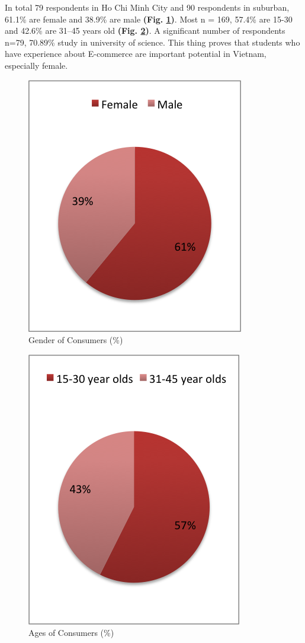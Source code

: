 \documentclass[conference]{IEEEtran}
\begin{document}
In total 79 respondents in Ho Chi Minh City and 90 respondents in suburban, 61.1\% are female and 38.9\% are male \textbf{(Fig. \ref{fig:genderofconsumers})}. Most n = 169, 57.4\% are 15-30 and 42.6\% are 31–45 years old \textbf{(Fig. \ref{fig:agesofconsumers})}. A significant number of respondents n=79, 70.89\% study in university of science. This thing proves that students who have experience about E-commerce are important potential in Vietnam, especially female. 

\begin{figure}[tbph]
\centering
\includegraphics[width=0.7\linewidth]{./genderofconsumers}
\caption{Gender of Consumers (\%)}
\label{fig:genderofconsumers}
\end{figure}

\begin{figure}[tbph]
\centering
\includegraphics[width=0.7\linewidth]{./age}
\caption{Ages of Consumers (\%)}
\label{fig:agesofconsumers}
\end{figure}
\end{document}
